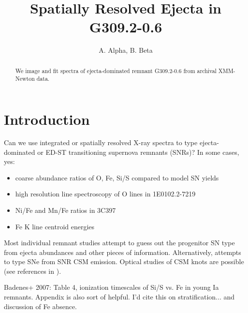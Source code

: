 \documentclass[preprint2,tighten,trackchanges]{aastex6}
\newcommand*{\tsup}{\textsuperscript}
\begin{document}
\title{Spatially Resolved Ejecta in G309.2-0.6}

\author{
A. Alpha, B. Beta%
}




\begin{abstract}
We image and fit spectra of ejecta-dominated remnant G309.2-0.6 from archival
XMM-Newton data.
\end{abstract}


\section{Introduction} \label{sec:intro}

Can we use integrated or spatially resolved X-ray spectra to type
ejecta-dominated or ED-ST transitioning supernova remnants (SNRs)?
In some cases, yes:
\begin{itemize}
    \item coarse abundance ratios of O, Fe, Si/S compared to model SN yields \citep{hughes1995}  %
    \item high resolution line spectroscopy of O lines in 1E0102.2-7219 \citep{flanagan2004}  %
    \item Ni/Fe and Mn/Fe ratios in 3C397 \citep{yamaguchi2015}
    \item Fe K line centroid energies \citep{yamaguchi2014-iron, patnaude2015}
\end{itemize}
Most individual remnant studies attempt to guess out the progenitor SN type
from ejecta abundances and other pieces of information.
Alternatively, \citet{chevalier2005} attempts to type SNe from SNR CSM
emission.
Optical studies of CSM knots are possible (see references in
\citet{katsuda2015}).

Badenes+ 2007: Table 4, ionization timescales of Si/S vs. Fe in young Ia remnants.
Appendix is also sort of helpful.
I'd cite this on stratification... and discussion of Fe absence.
\end{document}

